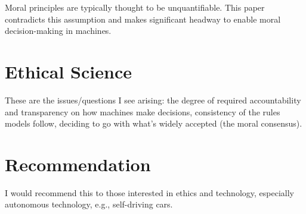 \documentclass[12pt, letterpaper]{article}
\begin{document}
Moral principles are typically thought to be unquantifiable. This paper contradicts this assumption and makes significant headway to enable moral decision-making in machines.

\section{Ethical Science}
\label{sec:ethical}

These are the issues/questions I see arising: the degree of required accountability and transparency on how machines make decisions, consistency of the rules models follow, deciding to go with what's widely accepted (the moral consensus).

\section{Recommendation}
\label{sec:rec}

I would recommend this to those interested in ethics and technology, especially autonomous technology, e.g., self-driving cars.




% 
% 












\end{document}

